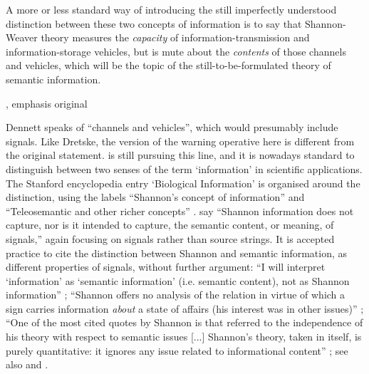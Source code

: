 \begin{myquote}
A more or less standard way of introducing the still imperfectly understood distinction between these two concepts of information is to say that Shannon-Weaver theory measures the \emph{capacity} of information-transmission and information-storage vehicles, but is mute about the \emph{contents} of those channels and vehicles, which will be the topic of the still-to-be-formulated theory of semantic information.
\par\hspace*{\fill}\citet[344]{dennett1983intentional}, emphasis original
\end{myquote}

\noindent Dennett speaks of ``channels and vehicles'', which would presumably include signals.
Like Dretske, the version of the warning operative here is different from the original statement.
\citet[$\S$6]{dennett2017bacteria} is still pursuing this line, and it is nowadays standard to distinguish between two senses of the term `information' in scientific applications.
The Stanford encyclopedia entry `Biological Information' is organised around the distinction, using the labels ``Shannon's concept of information'' and ``Teleosemantic and other richer concepts'' \citep{godfrey-smith2016biological}.
\citet[21]{piccinini2011information} say ``Shannon information does not capture, nor is it intended to capture, the semantic content, or meaning, of signals,'' again focusing on signals rather than source strings.
It is accepted practice to cite the distinction between Shannon and semantic information, as different properties of signals, without further argument: ``I will interpret ‘information’ as ‘semantic information’ (i.e. semantic content), not as Shannon information'' \citep[p. 12 n. 14]{artiga2020signals}; ``Shannon offers no analysis of the relation in virtue of which a sign carries information \textit{about} a state of affairs (his interest was in other issues)''  \citep[p. 7, emphasis original]{neander2017mark}; ``One of the most cited quotes by Shannon is that referred to the independence of his theory with respect to semantic issues [...] Shannon’s theory, taken in itself, is purely quantitative: it ignores any issue related to informational content'' \citep[1988-9]{lombardi2015shannon}; see also \citet[6]{cao2020new} and \citet[1]{kolchinsky2018semantic}.

